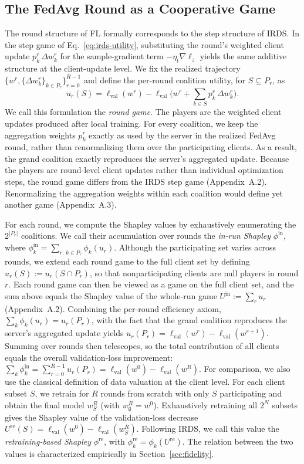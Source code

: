 \documentclass[letterpaper]{article} %
\theoremstyle{definition} %
\newcommand{\lval}{\ell_{\mathrm{val}}}
\begin{document}
\subsection{The FedAvg Round as a Cooperative Game}
\label{sec:game}

The round structure of FL formally corresponds to the step structure of IRDS.
In the step game of Eq.~\eqref{eq:irds-utility}, substituting the round's
weighted client update $p_k^r\,\Delta w_k^r$ for the sample-gradient term
$-\eta_t \nabla\ell_z$ yields the same additive structure at the client-update
level. We fix the realized trajectory
$\{w^r, \{\Delta w_k^r\}_{k \in P_r}\}_{r=0}^{R-1}$ and define the per-round
coalition utility, for $S \subseteq P_r$, as
\begin{equation}\label{eq:round-utility}
u_r(S) = \lval(w^r)
- \lval\Big(w^r + \textstyle\sum_{k \in S} p_k^r\, \Delta w_k^r\Big).
\end{equation}
We call this formulation the \emph{round game}. The players are the weighted
client updates produced after local training. For every coalition, we keep the
aggregation weights $p_k^r$ exactly as used by the server in the realized
FedAvg round, rather than renormalizing them over the participating clients.
As a result, the grand coalition exactly reproduces the server's aggregated
update. Because the players are round-level client updates rather than
individual optimization steps, the round game differs from the IRDS step game
(Appendix~A.2). Renormalizing the aggregation weights within each coalition
would define yet another game (Appendix~A.3).

For each round, we compute the Shapley values by exhaustively enumerating
the $2^{|P_r|}$ coalitions. We call their accumulation over rounds the
\emph{in-run Shapley} $\phi^{\mathrm{in}}$, where
$\phi_k^{\mathrm{in}}=\sum_{r:\,k\in P_r}\phi_k(u_r)$.
Although the participating set varies across rounds, we extend each round
game to the full client set by defining
$u_r(S) := u_r(S \cap P_r)$, so that nonparticipating clients are null
players in round $r$. 
Each round game can then be viewed as a game on
the full client set, and the sum above equals the Shapley value of the
whole-run game $U^{\mathrm{in}} := \sum_r u_r$ (Appendix~A.2). Combining the per-round efficiency axiom,
$\sum_k \phi_k(u_r) = u_r(P_r)$, with the fact that the grand coalition
reproduces the server's aggregated update yields
$u_r(P_r) = \lval(w^r) - \lval(w^{r+1})$. Summing over rounds then telescopes,
so the total contribution of all clients equals the overall validation-loss
improvement:
$
\sum_k \phi_k^{\mathrm{in}}
=
\sum_{r=0}^{R-1} u_r(P_r)
=
\lval(w^0)-\lval(w^R).$ 
For comparison, we also use the classical definition of data valuation at the
client level. For each client subset $S$, we retrain for $R$ rounds from
scratch with only $S$ participating and obtain the final model $w_S^R$ (with
$w_\emptyset^R = w^0$). Exhaustively retraining all $2^N$ subsets gives the
Shapley value of the validation-loss decrease
$U^{\mathrm{re}}(S) = \lval(w^0) - \lval(w_S^R)$. Following IRDS, we call this
value the \emph{retraining-based Shapley} $\phi^{\mathrm{re}}$, with
$\phi_k^{\mathrm{re}} = \phi_k(U^{\mathrm{re}})$. The relation between the two
values is characterized empirically in Section~\ref{sec:fidelity}.
\end{document}
